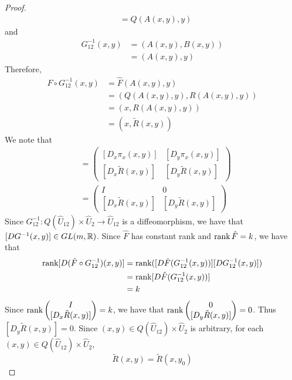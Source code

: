 \documentclass{book}
\begin{document}
\begin{proof}
\begin{align*}
			& = Q(A(x,y), y)
		\end{align*}
		and 
		\begin{align*}
			G_{12}^{-1}(x,y) 
			& = (A(x,y), B(x,y)) \\
			& = (A(x,y), y)
		\end{align*}
		Therefore, 
		\begin{align*}
			\hat{F} \circ G_{12}^{-1}(x,y) 
			& = \hat{F}(A(x,y), y) \\
			& = (Q(A(x,y), y), R(A(x,y), y)) \\
			& = (x, R(A(x,y), y)) \\
			& = (x, \tilde{R}(x, y))
		\end{align*}
		We note that 
		\begin{align*}
			[D(\hat{F} \circ G_{12}^{-1})(x,y)]
			& = 
			\begin{pmatrix}
				[D_x \pi_x(x,y)] & [D_y \pi_x(x,y)] \\
				[D_x \tilde{R}(x,y)]    & [D_y \tilde{R}(x,y)]   
			\end{pmatrix} \\
			& = 
			\begin{pmatrix}
				I                & 0 \\
				[D_x \tilde{R}(x,y)]    & [D_y \tilde{R}(x,y)]   
			\end{pmatrix}
		\end{align*}
		Since $G_{12}^{-1}: Q(\hat{U}_{12}) \times \hat{U}_2 \rightarrow \hat{U}_{12}$ is a diffeomorphism, we have that $[DG^{-1}(x, y)] \in GL(m, \mathbb{R})$. Since $\hat{F}$ has constant rank and $\operatorname{\text{rank}} \hat{F} = k$, we have that
		\begin{align*}
			\operatorname{\text{rank}} [D(\hat{F} \circ G_{12}^{-1})(x,y)] 
			& = \operatorname{\text{rank}} ([D\hat{F}(G_{12}^{-1}(x,y))] [DG_{12}^{-1}(x,y)]) \\
			& = \operatorname{\text{rank}} [D\hat{F}(G_{12}^{-1}(x,y))] \\
			& = k
		\end{align*}
		Since $\operatorname{\text{rank}} 
		\begin{pmatrix}
			I \\
			[D_x \tilde{R}(x,y)]  
		\end{pmatrix}
		= k$, we have that $\operatorname{\text{rank}} 
		\begin{pmatrix}
		0 \\
		[D_y \tilde{R}(x,y)]  
		\end{pmatrix}
		= 0$. Thus $[D_y \tilde{R}(x,y)] = 0$. Since $(x,y) \in Q(\hat{U}_{12}) \times \hat{U}_2$ is arbitrary, for each $(x,y) \in Q(\hat{U}_{12}) \times \hat{U}_2$, 
		$$\tilde{R}(x, y) = \tilde{R}(x, y_0)$$

\end{proof}
\end{document}
